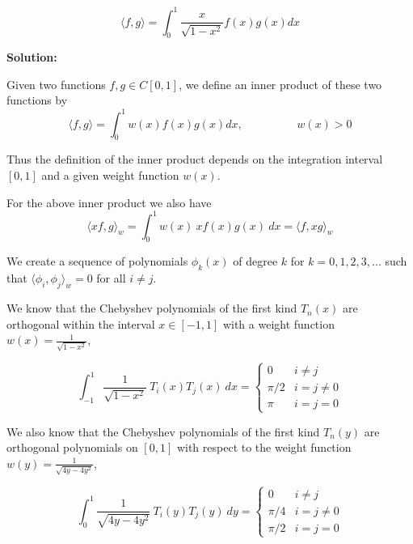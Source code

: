 \documentclass[a4paper,11pt]{report}
\begin{document}
\begin{enumerate}
\begin{itemize}
    \begin{equation*}
    \langle f, g \rangle = \int_{0}^{1} \frac{x}{\sqrt{1 - x^{2}}} f(x) g(x) dx
    \end{equation*}

    \textbf{Solution:}

    Given two functions $f, g \in C[0, 1]$, we define an inner product of 
    these two functions by
    \begin{equation*}
    \langle f, g \rangle = \int_{0}^{1} w(x) f(x) g(x) dx, \hspace{2cm} 
    w(x) > 0
    \end{equation*}
        
    Thus the definition of the inner product depends on the integration 
    interval $[0, 1]$ and a given weight function $w(x)$.

    For the above inner product we also have
    \begin{equation*}
    \langle xf, g \rangle_{w} = \int_{0}^{1} w(x)\ x f(x) g(x)\ dx = 
    \langle f, xg \rangle_{w}
    \end{equation*}

    We create a sequence of polynomials $\phi_{k}(x)$ of degree $k$ for 
    $k = 0, 1, 2, 3, ...$ such that $\langle \phi_{i}, \phi_{j} \rangle_{w} = 
    0$ for all $i \neq j$.

    We know that the Chebyshev polynomials of the first kind $T_{n}(x)$ are 
    orthogonal within the interval $x \in [-1, 1]$ with a weight function 
    $w(x) = \displaystyle \frac{1}{\sqrt{1 - x^{2}}}$,

    \begin{equation*}
    \int_{-1}^{1} \frac{1}{\sqrt{1 - x^2}}\ T_{i}(x) T_{j}(x)\ dx = 
    \begin{cases}
        0 & i \neq j \\
        \pi/2 & i = j \neq 0 \\
        \pi & i = j = 0
    \end{cases}
    \end{equation*}

    We also know that the Chebyshev polynomials of the first kind $T_{n}(y)$ 
    are orthogonal polynomials on $[0,1]$ with respect to the weight function
    $w(y) = \displaystyle \frac{1}{\sqrt{4y - 4y^2}}$,

    \begin{equation*}
    \int_{0}^{1} \frac{1}{\sqrt{4y - 4y^2}}\ T_{i}(y) T_{j}(y)\ dy = 
    \begin{cases}
        0 & i \neq j \\
        \pi/4 & i = j \neq 0 \\
        \pi/2 & i = j = 0
    \end{cases}
    \end{equation*}


\end{itemize}
\end{enumerate}
\end{document}
